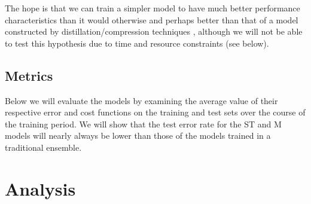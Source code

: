 \documentclass[english,a4paper,oneside]{amsart}
\theoremstyle{definition}
\begin{document}
The hope is that we can train a simpler model to have much better performance characteristics than it would otherwise and perhaps better than that of a model constructed by distillation/compression techniques \cite{Distillation,Compression}, although we will not be able to test this hypothesis due to time and resource constraints (see  below). 

\subsection{Metrics}
Below we will evaluate the models by examining the average value of their respective error and cost functions on the training and test sets over the course of the training period.  We will show that the test error rate for the ST and M models will nearly always be lower than those of the models trained in a traditional ensemble. %

\section{Analysis}
\end{document}
